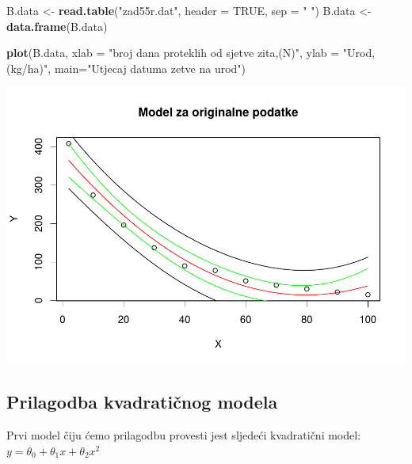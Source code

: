 \documentclass[]{article}
\newenvironment{Shaded}{\begin{snugshade}}{\end{snugshade}}
\newcommand{\KeywordTok}[1]{\textcolor[rgb]{0.13,0.29,0.53}{\textbf{{#1}}}}
\newcommand{\DataTypeTok}[1]{\textcolor[rgb]{0.13,0.29,0.53}{{#1}}}
\newcommand{\DecValTok}[1]{\textcolor[rgb]{0.00,0.00,0.81}{{#1}}}
\newcommand{\StringTok}[1]{\textcolor[rgb]{0.31,0.60,0.02}{{#1}}}
\newcommand{\OtherTok}[1]{\textcolor[rgb]{0.56,0.35,0.01}{{#1}}}
\newcommand{\NormalTok}[1]{{#1}}
\begin{document}
\begin{Shaded}
\begin{Highlighting}[]
\NormalTok{B.data <-}\StringTok{ }\KeywordTok{read.table}\NormalTok{(}\StringTok{"zad55r.dat"}\NormalTok{, }\DataTypeTok{header =} \OtherTok{TRUE}\NormalTok{, }\DataTypeTok{sep =} \StringTok{" "}\NormalTok{)}
\NormalTok{B.data <-}\StringTok{ }\KeywordTok{data.frame}\NormalTok{(B.data)}

\KeywordTok{plot}\NormalTok{(B.data, }\DataTypeTok{xlab =} \StringTok{"broj dana proteklih od sjetve zita,(N)"}\NormalTok{, }\DataTypeTok{ylab =} \StringTok{"Urod,(kg/ha)"}\NormalTok{,}
     \DataTypeTok{main=}\StringTok{"Utjecaj datuma zetve na urod"}\NormalTok{)}
\end{Highlighting}
\end{Shaded}

\includegraphics{Izvjestaj_files/figure-latex/unnamed-chunk-16-1.pdf}

\subsection{Prilagodba kvadratičnog
modela}\label{prilagodba-kvadraticnog-modela-1}

Prvi model čiju ćemo prilagodbu provesti jest sljedeći kvadratični
model: \(y = \theta_0 + \theta_1 x + \theta_2 x^2\)

\begin{Shaded}
\end{Shaded}
\end{document}
